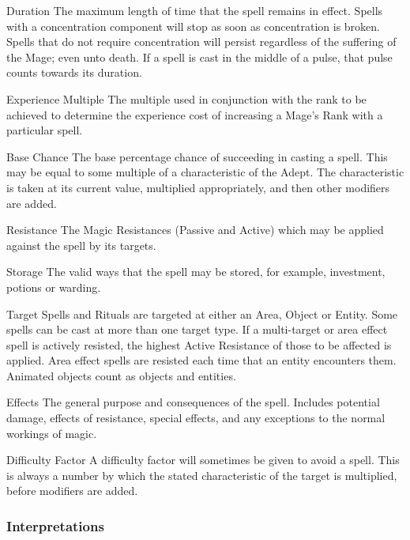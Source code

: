 \begin{multicols*}{3}
\begin{Description}
\item[Duration] The maximum length of time that the spell remains in
effect. Spells with a concentration component will stop as soon as
concentration is broken. Spells that do not require concentration will
persist regardless of the suffering of the Mage; even unto death.  If
a spell is cast in the middle of a pulse, that pulse counts towards
its duration.

\item[Experience Multiple] The multiple used in conjunction with the
rank to be achieved to determine the experience cost of increasing a
Mage's Rank with a particular spell.

\item[Base Chance] The base percentage chance of succeeding in casting
a spell.  This may be equal to some multiple of a characteristic of
the Adept. The characteristic is taken at its current value,
multiplied appropriately, and then other modifiers are added.

\item[Resistance] The Magic Resistances (Passive and Active) which may
be applied against the spell by its targets.

\item[Storage] The valid ways that the spell may be stored, for
example, investment, potions or warding.

\item[Target]
Spells and Rituals are targeted at either an Area, Object or
Entity. Some spells can be cast at more than one target type. If a
multi-target or area effect spell is actively resisted, the highest
Active Resistance of those to be affected is applied. Area effect
spells are resisted each time that an entity encounters them.
Animated objects count as objects and entities.

\item[Effects] The general purpose and consequences of the
spell. Includes potential damage, effects of resistance, special
effects, and any exceptions to the normal workings of magic.

\item[Difficulty Factor]
A difficulty factor will sometimes be given to avoid a spell. This is
always a number by which the stated characteristic of the target is
multiplied, before modifiers are added.

\end{Description}

\subsubsection{Interpretations}


\end{multicols*}
